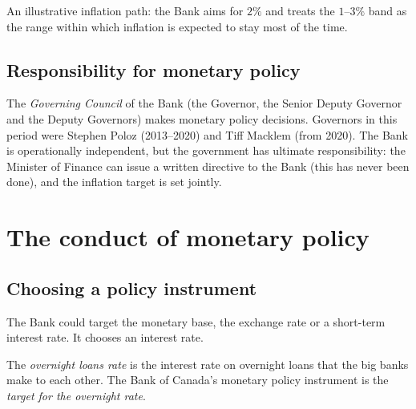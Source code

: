 \begin{center}
\end{center}
An illustrative inflation path: the Bank aims for $2\%$ and treats the $1$--$3\%$ band as
the range within which inflation is expected to stay most of the time.

\subsection{Responsibility for monetary policy}

The \emph{Governing Council} of the Bank (the Governor, the Senior Deputy Governor and
the Deputy Governors) makes monetary policy decisions. Governors in this period were
Stephen Poloz (2013--2020) and Tiff Macklem (from 2020). The Bank is operationally
independent, but the government has ultimate responsibility: the Minister of Finance can
issue a written directive to the Bank (this has never been done), and the inflation target
is set jointly.

\section{The conduct of monetary policy}

\subsection{Choosing a policy instrument}

The Bank could target the monetary base, the exchange rate or a short-term interest rate.
It chooses an interest rate.

\begin{definition}
The \emph{overnight loans rate} is the interest rate on overnight loans that the big banks
make to each other. The Bank of Canada's monetary policy instrument is the
\emph{target for the overnight rate}.
\end{definition}

